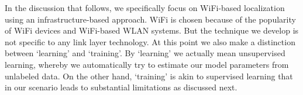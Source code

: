 In the discussion that follows, we specifically focus on WiFi-based localization using
an infrastructure-based approach. WiFi is chosen because of the popularity of WiFi devices and WiFi-based WLAN systems. But the technique we develop is not specific to any link layer technology. At this point we also make a distinction between `learning' and `training'. By `learning' we actually mean unsupervised learning, whereby we automatically try to estimate our model parameters from unlabeled data. On the other hand, `training' is akin
to supervised learning that in our scenario leads to substantial limitations as discussed next.


%
%
%
%
%
%
%

